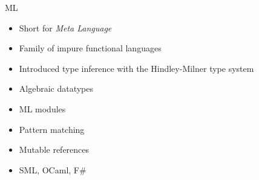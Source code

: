 \documentclass[pdf]{beamer}
\begin{document}
\begin{frame}{ML}
  \begin{figure}[H]
    \centering
    \hspace{0.3cm}
    \hspace{0.3cm}
    \hspace{0.3cm}
    \hspace{0.3cm}
  \end{figure}
  \begin{itemize}
    \item Short for \emph{Meta Language}
    \item Family of impure functional languages
    \item Introduced type inference with the Hindley-Milner type system
    \item Algebraic datatypes
    \item ML modules
    \item Pattern matching
    \item Mutable references
    \item SML, OCaml, F\#
  \end{itemize}
\end{frame}
\end{document}
